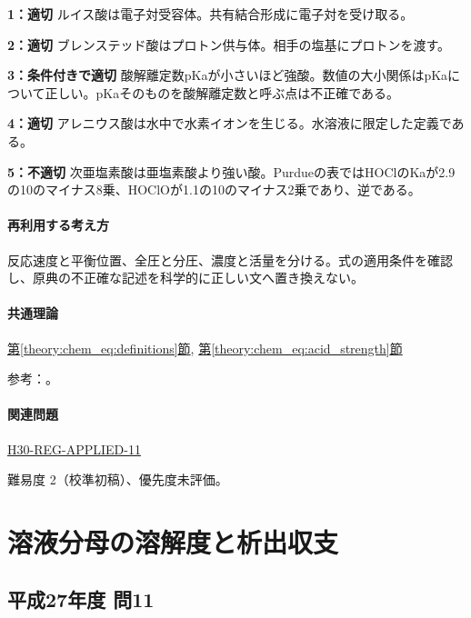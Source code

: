 \noindent\textbf{1：適切} ルイス酸は電子対受容体。共有結合形成に電子対を受け取る。\par

\noindent\textbf{2：適切} ブレンステッド酸はプロトン供与体。相手の塩基にプロトンを渡す。\par

\noindent\textbf{3：条件付きで適切} 酸解離定数pKaが小さいほど強酸。数値の大小関係はpKaについて正しい。pKaそのものを酸解離定数と呼ぶ点は不正確である。\par

\noindent\textbf{4：適切} アレニウス酸は水中で水素イオンを生じる。水溶液に限定した定義である。\par

\noindent\textbf{5：不適切} 次亜塩素酸は亜塩素酸より強い酸。Purdueの表ではHOClのKaが2.9の10のマイナス8乗、HOClOが1.1の10のマイナス2乗であり、逆である。\par

\paragraph{再利用する考え方} 反応速度と平衡位置、全圧と分圧、濃度と活量を分ける。式の適用条件を確認し、原典の不正確な記述を科学的に正しい文へ置き換えない。

\paragraph{共通理論} \hyperref[theory:chem_eq:definitions]{第\ref*{theory:chem_eq:definitions}節}, \hyperref[theory:chem_eq:acid_strength]{第\ref*{theory:chem_eq:acid_strength}節}

\par 参考：\cite{iupac_greenbook2012,purdue_acid_strength}。

\paragraph{関連問題} \hyperref[q:h30-reg-applied-11]{H30-REG-APPLIED-11}

\par 難易度 2（校準初稿）、優先度未評価。

\section{溶液分母の溶解度と析出収支}

\subsection{平成27年度 問11}
\label{q:h27-reg-applied-11}

